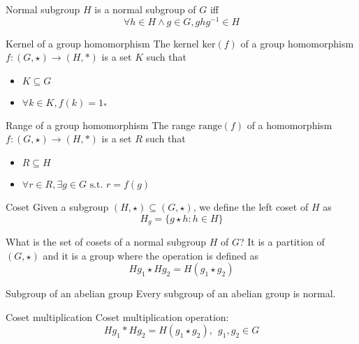 \documentclass[presentation]{beamer}
\begin{document}
\begin{frame}[label={sec:org766cad7}]{Normal subgroup}
\(H\) is a normal subgroup of \(G\) iff $$\forall h \in H \wedge g \in G, ghg^{-1} \in H$$
\end{frame}

\begin{frame}[label={sec:org1a0bee3}]{Kernel of a group homomorphism}
The \alert{kernel} \(\textrm{ker}(f)\) of a group homomorphism \(f: (G,\star)
    \rightarrow (H,*)\) is a set \(K\) such that

\begin{itemize}
\item \(K \subseteq G\)
\item \(\forall k \in K, f(k) = 1_{*}\)
\end{itemize}
\end{frame}

\begin{frame}[label={sec:org60dacd7}]{Range of a group homomorphism}
The \alert{range} \(\textrm{range}(f)\) of a homomorphism  \(f: (G,\star)
    \rightarrow (H,*)\) is a set \(R\) such that

\begin{itemize}
\item \(R \subseteq H\)
\item \(\forall r \in R, \exists g \in G \textrm{~s.t.~} r = f(g)\)
\end{itemize}
\end{frame}

\begin{frame}[label={sec:orgf8f60e6}]{Coset}
Given a subgroup \((H, \star) \subseteq (G, \star)\), we define the \alert{left coset} of \(H\) as
$$H_g = \{g \star h : h \in H\}$$
\end{frame}

\begin{frame}[label={sec:org9e4b754}]{What is the set of cosets of a normal subgroup \(H\) of \(G\)?}
It is a partition of \((G, \star)\) and it is a group where the operation is defined as
$$Hg_1 \star Hg_2 = H(g_1 \star g_2)$$
\end{frame}


\begin{frame}[label={sec:org66cf4cc}]{Subgroup of an abelian group}
Every subgroup of an abelian group is normal.
\end{frame}

\begin{frame}[label={sec:org0a5b843}]{Coset multiplication}
Coset multiplication operation: $$Hg_1 * Hg_2 = H(g_1 \star g_2),~~g_1,g_2 \in G$$
\end{frame}
\end{document}

